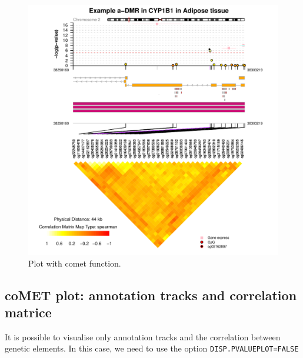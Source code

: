 \documentclass[11pt]{article}\usepackage[]{graphicx}\usepackage[usenames,dvipsnames]{color}
\makeatletter
\def\maxwidth{ %
  \ifdim\Gin@nat@width>\linewidth
    \linewidth
  \else
    \Gin@nat@width
  \fi
}
\newenvironment{knitrout}{}{} %
\makeatother
\begin{document}
\begin{figure}
\begin{knitrout}
\color{fgcolor}

{\centering \includegraphics[width=\maxwidth]{figure/minimal-cometPlot} 

}



\end{knitrout}
\caption{Plot with comet function.\label{fig:cometPlot}}
\end{figure}

\subsection{coMET plot: annotation tracks and correlation matrice}  
It is possible to visualise only annotation tracks and the correlation between genetic elements.
In this case, we need to use the option \texttt{DISP.PVALUEPLOT=FALSE}
\end{document}
